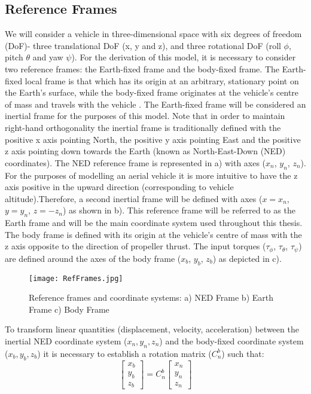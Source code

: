 \subsection{Reference Frames}
We will consider a vehicle in three-dimensional space with six degrees of freedom (DoF)- three translational DoF (x, y and z), and three rotational DoF (roll $\phi$, pitch $\theta$ and yaw $\psi$). For the derivation of this model, it is necessary to consider two reference frames: the Earth-fixed frame and the body-fixed frame. The Earth-fixed local frame is that which has its origin at an arbitrary, stationary point on the Earth's surface, while the body-fixed frame originates at the vehicle's centre of mass and travels with the vehicle \cite{Nebylov2016}. The Earth-fixed frame will be considered an inertial frame for the purposes of this model. Note that in order to maintain right-hand orthogonality the inertial frame is traditionally defined with the positive x axis pointing North, the positive y axis pointing East and the positive z axis pointing down towards the Earth (known as North-East-Down (NED) coordinates). The NED reference frame is represented in  a) with axes ($x_{n}$, $y_{n}$, $z_{n}$). For the purposes of modelling an aerial vehicle it is more intuitive to have the z axis positive in the upward direction (corresponding to vehicle altitude).Therefore, a second inertial frame will be defined with axes ($x=x_{n}$, $y=y_{n}$, $z=-z_{n}$) as shown in  b). This reference frame will be referred to as the Earth frame and will be the main coordinate system used throughout this thesis. The body frame is defined with its origin at the vehicle's centre of mass with the z axis opposite to the direction of propeller thrust. The input torques ($\tau_{\phi}$, $\tau_{\theta}$, $\tau_{\psi}$) are defined around the axes of the body frame ($x_{b}$, $y_{b}$, $z_{b}$) as depicted in  c).\\


\begin{figure}[htb]
	\texttt{[image: RefFrames.jpg]}%
	\caption{Reference frames and coordinate systems: a) NED Frame b) Earth Frame c) Body Frame}%
	\label{fig:RefFrames}%
\end{figure}

To transform linear quantities (displacement, velocity, acceleration) between the inertial NED coordinate system ($x_{n}, y_{n}, z_{n}$) and the body-fixed coordinate system ($x_{b}, y_{b}, z_{b}$) it is necessary to establish a rotation matrix ($C^{b}_{n}$) such that:
\[
\begin{bmatrix}
x_{b}\\ y_{b}\\ z_{b}
\end{bmatrix} = C^{b}_{n}\begin{bmatrix}
x_{n}\\ y_{n}\\ z_{n}
\end{bmatrix}
\]

